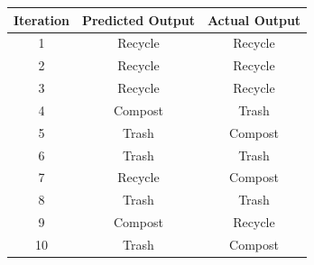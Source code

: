 \documentclass[12pt]{article}
\begin{document}
\small

\begin{center}
\begin{tabular}{|c|c|c|}
\hline
\textbf{Iteration} & \textbf{Predicted Output} & \textbf{Actual Output} \\ \hline

\rowcolor{green!20}
1 & Recycle & Recycle \\ \hline

\rowcolor{green!20}
2 & Recycle & Recycle \\ \hline

\rowcolor{green!20}
3 & Recycle & Recycle \\ \hline

4 & Compost & Trash \\ \hline

5 & Trash & Compost \\ \hline

\rowcolor{green!20}
6 & Trash & Trash \\ \hline

7 & Recycle & Compost \\ \hline

\rowcolor{green!20}
8 & Trash & Trash \\ \hline

9 & Compost & Recycle \\ \hline

10 & Trash & Compost \\ \hline

\end{tabular}
\end{center}

\normalsize
\end{document}
